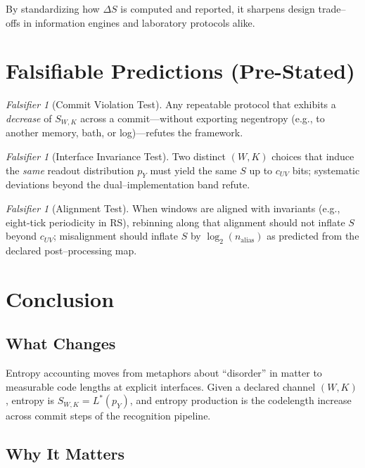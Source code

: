 \documentclass[11pt,letterpaper]{article}
\theoremstyle{definition}
\theoremstyle{remark}
\newtheorem{falsifier}[theorem]{Falsifier}
\begin{document}
By standardizing how \(\Delta S\) is computed and reported, it sharpens design trade--offs in information engines and laboratory protocols alike.

\section{Falsifiable Predictions (Pre-Stated)}

\begin{falsifier}[Commit Violation Test]
Any repeatable protocol that exhibits a \emph{decrease} of \(S_{W,K}\) across a commit---without exporting negentropy (e.g., to another memory, bath, or log)---refutes the framework.
\end{falsifier}

\begin{falsifier}[Interface Invariance Test]
Two distinct \((W,K)\) choices that induce the \emph{same} readout distribution \(p_Y\) must yield the same \(S\) up to \(c_{UV}\) bits; systematic deviations beyond the dual--implementation band refute.
\end{falsifier}

\begin{falsifier}[Alignment Test]
When windows are aligned with invariants (e.g., eight-tick periodicity in RS), rebinning along that alignment should not inflate \(S\) beyond \(c_{UV}\); misalignment should inflate \(S\) by \(\log_2(n_{\text{alias}})\) as predicted from the declared post--processing map.
\end{falsifier}

\section{Conclusion}

\subsection{What Changes}

Entropy accounting moves from metaphors about ``disorder'' in matter to measurable code lengths at explicit interfaces. Given a declared channel \((W,K)\), entropy is \(S_{W,K}=L^\ast(p_Y)\), and entropy production is the codelength increase across commit steps of the recognition pipeline.

\subsection{Why It Matters}
\end{document}
